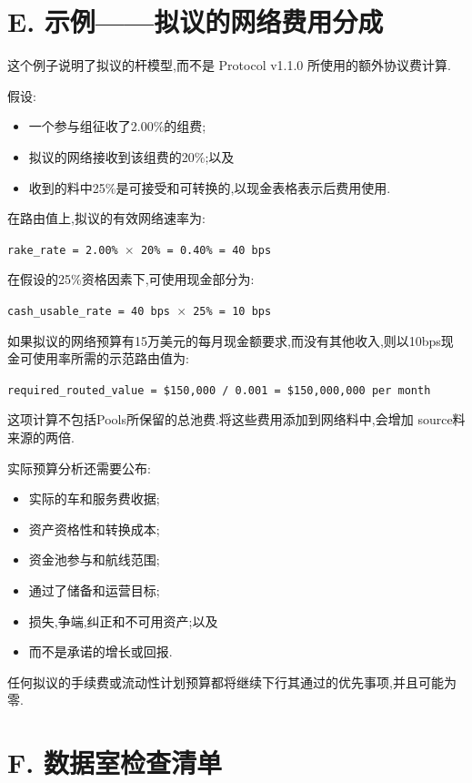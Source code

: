 \documentclass[11pt]{article}
\begin{document}
\section*{E. 示例------拟议的网络费用分成}

这个例子说明了拟议的杆模型,而不是 Protocol v1.1.0 所使用的额外协议费计算.

假设:

\begin{itemize}[leftmargin=*]
\item 一个参与组征收了2.00\%的组费;
\item 拟议的网络接收到该组费的20\%;以及
\item 收到的料中25\%是可接受和可转换的,以现金表格表示后费用使用.
\end{itemize}
在路由值上,拟议的有效网络速率为:

\texttt{rake\_rate = 2.00\% $\times$ 20\% = 0.40\% = 40 bps}

在假设的25\%资格因素下,可使用现金部分为:

\texttt{cash\_usable\_rate = 40 bps $\times$ 25\% = 10 bps}

如果拟议的网络预算有15万美元的每月现金额要求,而没有其他收入,则以10bps现金可使用率所需的示范路由值为:

\texttt{required\_routed\_value = \$150,000 / 0.001 = \$150,000,000 per month}

这项计算不包括Pools所保留的总池费.将这些费用添加到网络料中,会增加 source料来源的两倍.

实际预算分析还需要公布:

\begin{itemize}[leftmargin=*]
\item 实际的车和服务费收据;
\item 资产资格性和转换成本;
\item 资金池参与和航线范围;
\item 通过了储备和运营目标;
\item 损失,争端,纠正和不可用资产;以及
\item 而不是承诺的增长或回报.
\end{itemize}
任何拟议的手续费或流动性计划预算都将继续下行其通过的优先事项,并且可能为零.


\section*{F. 数据室检查清单}
\end{document}
